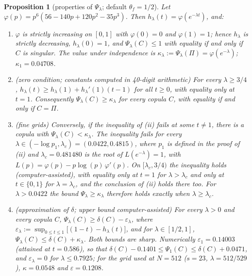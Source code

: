 \documentclass[11pt,a4paper]{article}
\newtheorem{proposition}[theorem]{Proposition}
\theoremstyle{definition}
\theoremstyle{remark}
\begin{document}
\begin{proposition}[properties of $\Psi_\lambda$; default $\theta_f=1/2$]\label{prop:psi}
Let $\varphi(p)=p^6(56-140p+120p^2-35p^3)$. Then $h_\lambda(t)=\varphi(e^{-\lambda t})$, and:
\begin{enumerate}[label=(\roman*)]
\item $\varphi$ is strictly increasing on $[0,1]$ with $\varphi(0)=0$ and $\varphi(1)=1$; hence $h_\lambda$ is strictly decreasing, $h_\lambda(0)=1$, and $\Psi_\lambda(C)\le1$ with equality if and only if $C$ is singular. The value under independence is $\kappa_\lambda:=\Psi_\lambda(\Pi)=\varphi(e^{-\lambda})$; $\kappa_1=0.04708$.
\item (zero condition; constants computed in 40-digit arithmetic) For every $\lambda\ge3/4$, $h_\lambda(t)\ge h_\lambda(1)+h_\lambda'(1)(t-1)$ for all $t\ge0$, with equality only at $t=1$. Consequently $\Psi_\lambda(C)\ge\kappa_\lambda$ for every copula $C$, with equality if and only if $C=\Pi$.
\item (fine grids) Conversely, if the inequality of (ii) fails at some $t\neq1$, there is a copula with $\Psi_\lambda(C)<\kappa_\lambda$. The inequality fails for every $\lambda\in(-\log p_1,\lambda_c)=(0.0422,0.4815)$, where $p_1$ is defined in the proof of (ii) and $\lambda_c=0.481480$ is the root of $L(e^{-\lambda})=1$, with $L(p)=\varphi(p)-p\log(p)\,\varphi'(p)$. On $[\lambda_c,3/4)$ the inequality holds (computer-assisted), with equality only at $t=1$ for $\lambda>\lambda_c$ and only at $t\in\{0,1\}$ for $\lambda=\lambda_c$, and the conclusion of (ii) holds there too. For $\lambda>0.0422$ the bound $\Psi_\lambda\ge\kappa_\lambda$ therefore holds exactly when $\lambda\ge\lambda_c$.
\item (approximation of $\delta$; upper bound computer-assisted) For every $\lambda>0$ and every copula $C$, $\Psi_\lambda(C)\ge\delta(C)-\varepsilon_\lambda$, where $\varepsilon_\lambda:=\sup_{0\le t\le1}\big[(1-t)-h_\lambda(t)\big]$, and for $\lambda\in[1/2,1]$, $\Psi_\lambda(C)\le\delta(C)+\kappa_\lambda$. Both bounds are sharp. Numerically $\varepsilon_1=0.14003$ (attained at $t=0.586$), so that $\delta(C)-0.1401\le\Psi_1(C)\le\delta(C)+0.0471$, and $\varepsilon_\lambda=0$ for $\lambda\le0.7925$; for the grid used at $N=512$ ($s=23$, $\lambda=512/529$), $\kappa=0.0548$ and $\varepsilon=0.1208$.
\end{enumerate}
\end{proposition}
\end{document}
